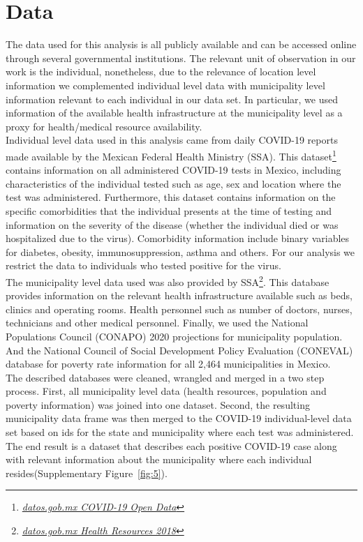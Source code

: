 \documentclass[hidelinks,10pt]{article}
\begin{document}
	\section{Data}\label{sec_data}
	
	The data used for this analysis is all publicly available and can be accessed online through several governmental institutions. The relevant unit of observation in our work is the individual, nonetheless, due to the relevance of location level information we complemented individual level data with municipality level information relevant to each individual in our data set. In particular, we used information of the available health infrastructure at the municipality level as a proxy for health/medical resource availability. \\
	Individual level data used in this analysis came from daily COVID-19 reports made available by the Mexican Federal Health Ministry (SSA). This dataset\footnote{\href{http://187.191.75.115/gobmx/salud/datos_abiertos/datos_abiertos_covid19.zip}{\textit{ datos.gob.mx COVID-19 Open Data}}} contains information on all administered COVID-19 tests in Mexico, including characteristics of the individual tested such as age, sex and location where the test was administered. Furthermore, this dataset contains information on the specific comorbidities that the individual presents at the time of testing and information on the severity of the disease (whether the individual died or was hospitalized due to the virus). Comorbidity information include binary variables for diabetes, obesity, immunosuppression, asthma and others. For our analysis we restrict the data to individuals who tested positive for the virus.  \\
	The municipality level data used was also provided by SSA\footnote{\href{https://datos.gob.mx/busca/dataset/recursos-en-salud-nivel-central/resource/b3949d5e-8438-4613-9b4a-8c4136c4a991}{\textit{ datos.gob.mx Health Resources 2018}}}. This database provides information on the relevant health infrastructure available such as beds, clinics and operating rooms. Health personnel such as number of doctors, nurses, technicians and other medical personnel. Finally, we used the National Populations Council (CONAPO) 2020 projections for municipality population. And the National Council of Social Development Policy Evaluation (CONEVAL) database for poverty rate information for all 2,464 municipalities in Mexico.  \\
	The described databases were cleaned, wrangled and merged in a two step process. First, all municipality level data (health resources, population and poverty information) was joined into one dataset. Second, the resulting municipality data frame was then merged to  the COVID-19 individual-level data set based on ids for the state and municipality where each test was administered. The end result is a dataset that describes each positive COVID-19 case along with relevant information about the municipality where each individual resides(Supplementary Figure~\ref{fig:5}).
\end{document}
